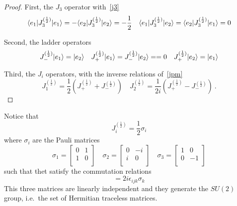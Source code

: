     \begin{proof}
        First, the $J_3$ operator with~\eqref{j3}
        \begin{equation*}
            \langle e_1\vert J_3^{(\frac{1}{2})} \vert e_1\rangle = - \langle e_2\vert J_3^{(\frac{1}{2})} \vert e_2\rangle = - \frac{1}{2} \quad \langle e_1\vert J_3^{(\frac{1}{2})} \vert e_2\rangle = \langle e_2\vert J_3^{(\frac{1}{2})} \vert e_1\rangle = 0
        \end{equation*}
    
        Second, the ladder operators 
        \begin{equation*}
            J_-^{(\frac{1}{2})} \vert e_1\rangle =  \vert e_2\rangle \quad J_+^{(\frac{1}{2})} \vert e_1\rangle = J_-^{(\frac{1}{2})} \vert e_2\rangle = = 0 \quad J_+^{(\frac{1}{2})} \vert e_2\rangle =  \vert e_1\rangle
        \end{equation*}
        
        Third, the $J_i$ operators, with the inverse relations of~\eqref{jpm}
        \begin{equation*}
            J_1^{(\frac{1}{2})} = \frac{1}{2} (J_+^{(\frac{1}{2})} + J_-^{(\frac{1}{2})}) \quad J_2^{(\frac{1}{2})} = \frac{1}{2i} (J_+^{(\frac{1}{2})} - J_-^{(\frac{1}{2})}) ~.
        \end{equation*}
    \end{proof}    

    Notice that 
    \begin{equation*}
        J_i^{(\frac{1}{2})} = \frac{1}{2} \sigma_i
    \end{equation*}
    where $\sigma_i$ are the Pauli matrices 
    \begin{equation*}
        \sigma_1 = \begin{bmatrix} 0 & 1 \\ 1 & 0 \\ \end{bmatrix} \quad \sigma_2 = \begin{bmatrix} 0 & -i \\ i & 0 \\ \end{bmatrix} \quad \sigma_3 = \begin{bmatrix} 1 & 0 \\ 0 & -1 \\ \end{bmatrix}
    \end{equation*}
    such that thet satisfy the commutation relations
    \begin{equation*}
        [\sigma_i, \sigma_j] = 2 i \epsilon_{ijk} \sigma_k
    \end{equation*}
    This three matrices are linearly independent and they generate the $SU(2)$ group, i.e.~the set of Hermitian traceless matrices. 
    
